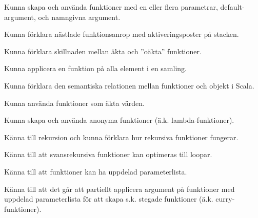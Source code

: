 
\item Kunna skapa och använda funktioner med en eller flera parametrar, default-argument, och namngivna argument.
\item Kunna förklara nästlade funktionsanrop med aktiveringsposter på stacken.
\item Kunna förklara skillnaden mellan äkta och ''oäkta'' funktioner.
\item Kunna applicera en funktion på alla element i en samling.

\item Kunna förklara den semantiska relationen mellan funktioner och objekt i Scala.
\item Kunna använda funktioner som äkta värden.
\item Kunna skapa och använda anonyma funktioner (ä.k. lambda-funktioner).

\item Känna till rekursion och kunna förklara hur rekursiva funktioner fungerar.
\item Känna till att svansrekursiva funktioner kan optimeras till loopar.

\item Känna till att funktioner kan ha uppdelad parameterlista.
\item Känna till att det går att partiellt applicera argument på funktioner med uppdelad parameterlista för att skapa s.k. stegade funktioner (ä.k. curry-funktioner).
